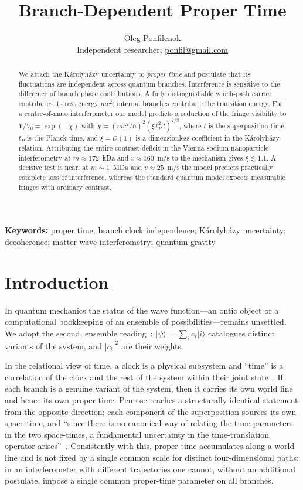 \documentclass[11pt,a4paper]{article}
\title{\textbf{Branch-Dependent Proper Time}}
\author{%
  Oleg Ponfilenok\\[0.35em]%
  {\normalsize Independent researcher; \href{mailto:ponfil@gmail.com}{ponfil@gmail.com}}%
}
\date{}
\begin{document}
\maketitle

\begin{abstract}
We attach the K\'arolyh\'azy uncertainty to \emph{proper time} and postulate that its fluctuations are independent across quantum branches. Interference is sensitive to the difference of branch phase contributions. A fully distinguishable which-path carrier contributes its rest energy $mc^2$; internal branches contribute the transition energy. For a centre-of-mass interferometer our model predicts a reduction of the fringe visibility to $V/V_0=\exp(-\chi)$ with $\chi=(mc^2/\hbar)^2(\xi\,t_P^2\,t)^{2/3}$, where $t$ is the superposition time, $t_P$ is the Planck time, and $\xi=\mathcal O(1)$ is a dimensionless coefficient in the K\'arolyh\'azy relation. Attributing the entire contrast deficit in the Vienna sodium-nanoparticle interferometry at $m\approx172$~kDa and $v\approx160$~m/s to the mechanism gives $\xi\lesssim 1.1$. A decisive test is near: at $m\sim 1$~MDa and $v\approx 25$~m/s the model predicts practically complete loss of interference, whereas the standard quantum model expects measurable fringes with ordinary contrast.
\end{abstract}

\noindent\textbf{Keywords:} proper time; branch clock independence; K\'arolyh\'azy uncertainty; decoherence; matter-wave interferometry; quantum gravity

\vspace{1em}

\section{Introduction}\label{sec:intro}

In quantum mechanics the status of the wave function---an ontic object or a computational bookkeeping of an ensemble of possibilities---remains unsettled. We adopt the second, ensemble reading~\cite{ballentine1970,home1992}: $\lvert\psi\rangle=\sum_i c_i\lvert i\rangle$ catalogues distinct variants of the system, and $|c_i|^2$ are their weights.

In the relational view of time, a clock is a physical subsystem and ``time'' is a correlation of the clock and the rest of the system within their joint state~\cite{pagewootters}. If each branch is a genuine variant of the system, then it carries its own world line and hence its own proper time. Penrose reaches a structurally identical statement from the opposite direction: each component of the superposition sources its own space-time, and ``since there is no canonical way of relating the time parameters in the two space-times, a fundamental uncertainty in the time-translation operator arises''~\cite{penrose1996}. Consistently with this, proper time accumulates along a world line and is not fixed by a single common scale for distinct four-dimensional paths: in an interferometer with different trajectories one cannot, without an additional postulate, impose a single common proper-time parameter on all branches.
\end{document}
